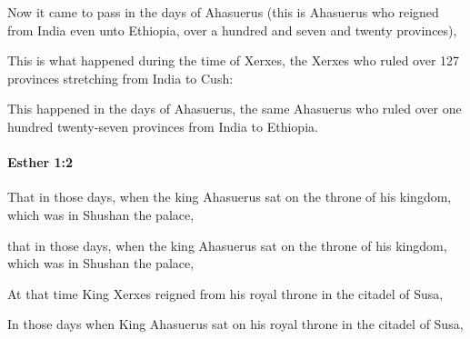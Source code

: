 \begin{versebox}
					\item[ASV] Now it came to pass in the days of Ahasuerus (this is Ahasuerus who reigned from India even unto Ethiopia, over a hundred and seven and twenty provinces),
					\item[NIV] This is what happened during the time of Xerxes, the Xerxes who ruled over 127 provinces stretching from India to Cush:
					\item[NRSV] This happened in the days of Ahasuerus, the same Ahasuerus who ruled over one hundred twenty-seven provinces from India to Ethiopia.
			\end{versebox}

		\paragraph{Esther 1:2} %
			\label{ESTHER-1-2}

			That in those days, when the king Ahasuerus sat on the throne of his kingdom, which was in Shushan the palace,

			\begin{versebox}
					\item[BHS] 
					\item[LXX] 
					\item[ASV] that in those days, when the king Ahasuerus sat on the throne of his kingdom, which was in Shushan the palace,
					\item[NIV] At that time King Xerxes reigned from his royal throne in the citadel of Susa,
					\item[NRSV] In those days when King Ahasuerus sat on his royal throne in the citadel of Susa,
			\end{versebox}

